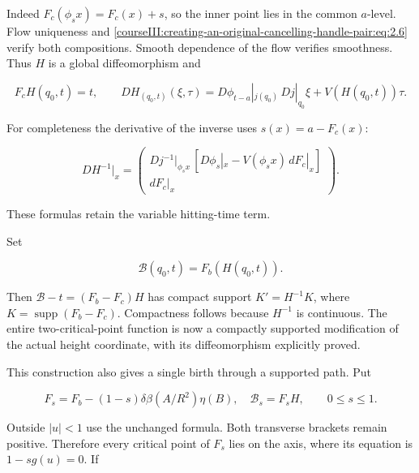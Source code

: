 Indeed \(F_c(\phi_sx)=F_c(x)+s\), so the inner point lies in the common \(a\)-level. Flow uniqueness and \eqref{courseIII:creating-an-original-cancelling-handle-pair:eq:2.6} verify both compositions. Smooth dependence of the flow verifies smoothness. Thus \(H\) is a global diffeomorphism and

\begin{equation}
F_cH(q_0,t)=t,\qquad
 D H_{(q_0,t)}(\xi,\tau)
  =D\phi_{t-a}|_{j(q_0)}\,Dj|_{q_0}\xi+V(H(q_0,t))\tau.
 \label{courseIII:creating-an-original-cancelling-handle-pair:eq:3.4}
\end{equation}

For completeness the derivative of the inverse uses \(s(x)=a-F_c(x)\):

\begin{equation}
D H^{-1}|_x=
 \begin{pmatrix}
 Dj^{-1}|_{\phi_sx}\,[D\phi_s|_x-V(\phi_sx)\,dF_c|_x]\\
 dF_c|_x
 \end{pmatrix}.
 \label{courseIII:creating-an-original-cancelling-handle-pair:eq:3.5}
\end{equation}

These formulas retain the variable hitting-time term.

Set

\begin{equation}
\mathcal B(q_0,t)=F_b(H(q_0,t)).
 \label{courseIII:creating-an-original-cancelling-handle-pair:eq:3.6}
\end{equation}

Then \(\mathcal B-t=(F_b-F_c)H\) has compact support \(K'=H^{-1}K\), where \(K=\operatorname{supp}(F_b-F_c)\). Compactness follows because \(H^{-1}\) is continuous. The entire two-critical-point function is now a compactly supported modification of the actual height coordinate, with its diffeomorphism explicitly proved.

This construction also gives a single birth through a supported path. Put

\begin{equation}
F_s=F_b-(1-s)\delta\beta(A/R^2)\eta(B),\quad
 \mathcal B_s=F_sH,\qquad 0\leq s\leq1.
 \label{courseIII:creating-an-original-cancelling-handle-pair:eq:3.7}
\end{equation}

Outside \(|u|<1\) use the unchanged formula. Both transverse brackets remain positive. Therefore every critical point of \(F_s\) lies on the axis, where its equation is \(1-sg(u)=0\). If

